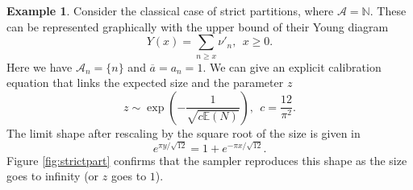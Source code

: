\documentclass[a4paper,10pt]{article}
\theoremstyle{definition}
\newtheorem{example}[theorem]{Example}
\newcommand{\EE}{\mathbb{E}}
\newcommand{\Aa}{\mathcal{A}}
\newcommand{\NN}{\mathbb{N}}
\begin{document}
\begin{example}\label{ex:plain}
    Consider the classical case of strict partitions, where $\Aa=\NN$. These can be represented graphically with the upper bound of their Young diagram
    \begin{equation*}
        Y(x)= \sum_{n \geq x}\nu'_n, ~~ x\geq 0.
    \end{equation*}
    Here we have $\Aa_n=\{n\}$ and $\overline{a}=a_n=1$. We can give an explicit calibration equation that links the expected size and the parameter $z$
    \begin{equation*}
        z \sim \exp\left(-\frac{1}{\sqrt{c \EE(N)}} \right) ,~~c=\frac{12}{\pi^2}.
    \end{equation*}
    The limit shape after rescaling by the square root of the size is given in \cite{Vershik}
    \begin{equation*}
       e^{\pi y/\sqrt{12}} = 1+e^{-\pi x/\sqrt{12}}.
    \end{equation*}
    Figure \ref{fig:strictpart} confirms that the sampler reproduces this shape as the size goes to infinity (or $z$ goes to $1$).
    

\end{example}
\end{document}
